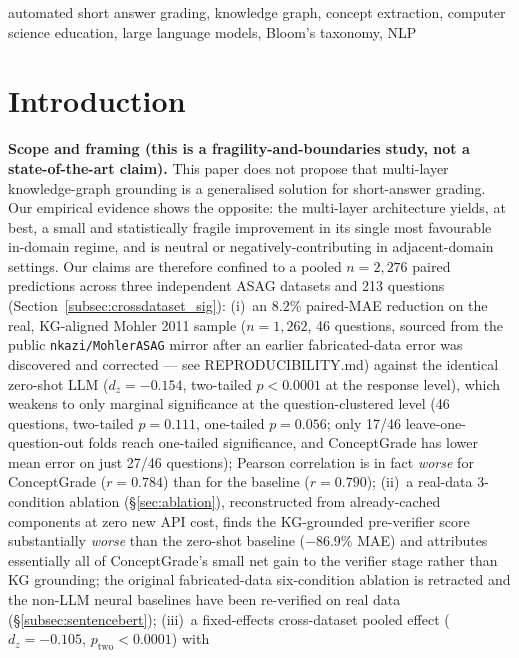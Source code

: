 \documentclass[conference]{IEEEtran}
\begin{document}
\begin{IEEEkeywords}
automated short answer grading, knowledge graph, concept extraction,
computer science education, large language models, Bloom's taxonomy, NLP
\end{IEEEkeywords}

\section{Introduction}

\textbf{Scope and framing (this is a fragility-and-boundaries study,
not a state-of-the-art claim).} This paper does not propose that
multi-layer knowledge-graph grounding is a generalised solution for
short-answer grading. Our empirical evidence shows the opposite: the
multi-layer architecture yields, at best, a small and statistically
fragile improvement in its single most favourable in-domain regime, and
is neutral or negatively-contributing in adjacent-domain settings. Our
claims are therefore confined to a pooled $n = 2{,}276$ paired
predictions across three independent ASAG datasets and 213 questions
(Section~\ref{subsec:crossdataset_sig}): (i)~an $8.2\%$ paired-MAE
reduction on the real, KG-aligned Mohler 2011 sample ($n=1{,}262$,
46 questions, sourced from the public \texttt{nkazi/MohlerASAG} mirror
after an earlier fabricated-data error was discovered and corrected ---
see REPRODUCIBILITY.md) against the identical zero-shot LLM ($d_z =
-0.154$, two-tailed $p<0.0001$ at the response level), which weakens to
only marginal significance at the question-clustered level (46
questions, two-tailed $p=0.111$, one-tailed $p=0.056$; only 17/46
leave-one-question-out folds reach one-tailed significance, and
ConceptGrade has lower mean error on just 27/46 questions); Pearson
correlation is in fact \emph{worse} for ConceptGrade ($r=0.784$) than
for the baseline ($r=0.790$); (ii)~a real-data 3-condition ablation
(\S\ref{sec:ablation}), reconstructed from already-cached components at
zero new API cost, finds the KG-grounded pre-verifier score
substantially \emph{worse} than the zero-shot baseline
($-86.9\%$ MAE) and attributes essentially all of ConceptGrade's small
net gain to the verifier stage rather than KG grounding; the original
fabricated-data six-condition ablation is retracted and the
non-LLM neural baselines have been re-verified on real data
(\S\ref{subsec:sentencebert}); (iii)~a
fixed-effects cross-dataset pooled effect ($d_z = -0.105$,
$p_{\text{two}} < 0.0001$) with
\end{document}
